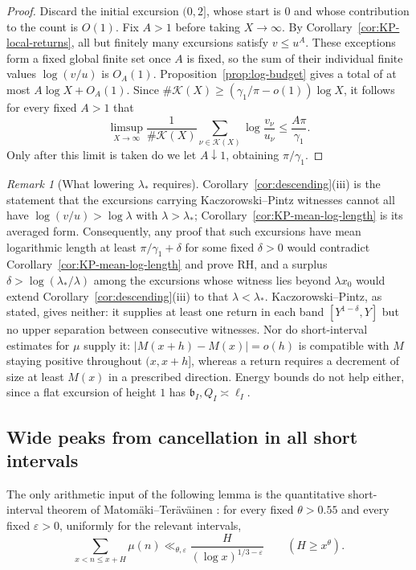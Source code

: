 \documentclass[11pt]{amsart}
\numberwithin{equation}{section}
\theoremstyle{plain}
\theoremstyle{definition}
\theoremstyle{remark}
\newtheorem{remark}[theorem]{Remark}
\begin{document}
\begin{proof}
Discard the initial excursion $(0,2]$, whose start is $0$ and whose
contribution to the count is $O(1)$. Fix $A>1$ before taking $X\to\infty$.
By Corollary~\ref{cor:KP-local-returns}, all but finitely many excursions
satisfy $v\le u^A$. These exceptions form a fixed global finite set once
$A$ is fixed, so the sum of their individual finite values $\log(v/u)$ is
$O_A(1)$. Proposition~\ref{prop:log-budget} gives a total of at most
$A\log X+O_A(1)$. Since
$\#\mathcal K(X)\ge(\gamma_1/\pi-o(1))\log X$, it follows for every fixed
$A>1$ that
\[
\limsup_{X\to\infty}
\frac1{\#\mathcal K(X)}\sum_{\nu\in\mathcal K(X)}
\log\frac{v_\nu}{u_\nu}
\le \frac{A\pi}{\gamma_1}.
\]
Only after this limit is taken do we let $A\downarrow1$, obtaining
$\pi/\gamma_1$.
\end{proof}

\begin{remark}[What lowering $\lambda_*$ requires]
\label{rem:surplus}
Corollary~\ref{cor:descending}(iii) is the statement that the
excursions carrying Kaczorowski--Pintz witnesses cannot all have
$\log(v/u)>\log\lambda$ with $\lambda>\lambda_*$;
Corollary~\ref{cor:KP-mean-log-length} is its averaged form. Consequently,
any proof that such excursions have mean logarithmic length at least
$\pi/\gamma_1+\delta$ for some fixed $\delta>0$ would contradict
Corollary~\ref{cor:KP-mean-log-length} and prove RH, and a surplus
$\delta>\log(\lambda_*/\lambda)$ among the excursions whose witness lies
beyond $\lambda x_0$ would extend Corollary~\ref{cor:descending}(iii) to
that $\lambda<\lambda_*$. Kaczorowski--Pintz, as stated, gives neither: it
supplies at least one return in each band $[Y^{1-\delta},Y]$ but no upper
separation between consecutive witnesses. Nor do short-interval estimates
for $\mu$ supply it: $|M(x+h)-M(x)|=o(h)$ is compatible with $M$ staying
positive throughout $(x,x+h]$, whereas a return requires a decrement of
size at least $M(x)$ in a prescribed direction. Energy bounds do not help
either, since a flat excursion of height $1$ has $\mathfrak b_I,Q_I\asymp\ell_I$.
\end{remark}

\subsection*{Wide peaks from cancellation in all short intervals}

The only arithmetic input of the following lemma is the quantitative short-interval theorem of
Matom\"aki--Ter\"av\"ainen \cite[Theorem~1.1]{MatomakiTeravainen2023}: for every fixed
$\theta>0.55$ and every fixed $\varepsilon>0$, uniformly for the relevant intervals,
\[
 \sum_{x<n\le x+H}\mu(n)
 \ll_{\theta,\varepsilon} \frac{H}{(\log x)^{1/3-\varepsilon}}
 \qquad(H\ge x^\theta).
\]
\end{document}
